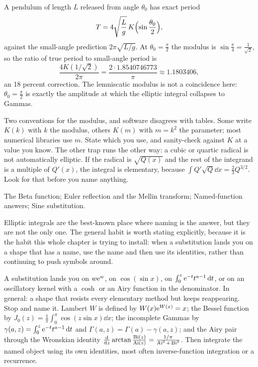 \begin{worked}
A pendulum of length $L$ released from angle $\theta_0$ has exact period
\[T=4\sqrt{\frac Lg}\,K\Bigl(\sin\frac{\theta_0}{2}\Bigr),\]
against the small-angle prediction $2\pi\sqrt{L/g}$. At $\theta_0=\tfrac\pi2$ the modulus is $\sin\tfrac\pi4=\tfrac{1}{\sqrt2}$, so the ratio of true period to small-angle period is
\[\frac{4K(1/\sqrt2)}{2\pi}=\frac{2\cdot1.8540746773}{\pi}\approx1.1803406,\]
an 18 percent correction. The lemniscatic modulus is not a coincidence here: $\theta_0=\tfrac\pi2$ is exactly the amplitude at which the elliptic integral collapses to Gammas.
\end{worked}

\begin{trap}
Two conventions for the modulus, and software disagrees with tables. Some write $K(k)$ with $k$ the modulus, others $K(m)$ with $m=k^{2}$ the parameter; most numerical libraries use $m$. State which you use, and sanity-check against $K$ at a value you know. The other trap runs the other way: a cubic or quartic radical is not automatically elliptic. If the radical is $\sqrt{Q(x)}$ and the rest of the integrand is a multiple of $Q'(x)$, the integral is elementary, because $\int Q'\sqrt{Q}\dd x=\tfrac23Q^{3/2}$. Look for that before you name anything.
\end{trap}

\begin{seealsob}The Beta function; Euler reflection and the Mellin transform; Named-function answers; Sine substitution.\end{seealsob}

Elliptic integrals are the best-known place where naming is the answer, but they are not the only one. The general habit is worth stating explicitly, because it is the habit this whole chapter is trying to install: when a substitution lands you on a shape that has a name, use the name and then use its identities, rather than continuing to push symbols around.

\cue A substitution lands you on $w\mathrm{e}^{w}$, on $\cos(\sin x)$, on $\int_0^{z}\mathrm{e}^{-t}t^{a-1}\,\mathrm{d} t$, or on an oscillatory kernel with a $\cosh$ or an Airy function in the denominator. In general: a shape that resists every elementary method but keeps reappearing.
\method Stop and name it. Lambert $W$ is defined by $W(x)\mathrm{e}^{W(x)}=x$; the Bessel function by $J_0(z)=\tfrac1\pi\int_0^{\pi}\cos(z\sin x)\dd x$; the incomplete Gammas by $\gamma(a,z)=\int_0^{z}\mathrm{e}^{-t}t^{a-1}\,\mathrm{d} t$ and $\Gamma(a,z)=\Gamma(a)-\gamma(a,z)$; and the Airy pair through the Wronskian identity $\frac{\mathrm{d}}{\mathrm{d}z}\arctan\frac{\operatorname{Bi}(z)}{\operatorname{Ai}(z)}=\frac{1/\pi}{\operatorname{Ai}^{2}+\operatorname{Bi}^{2}}$. Then integrate the named object using its own identities, most often inverse-function integration or a recurrence.

